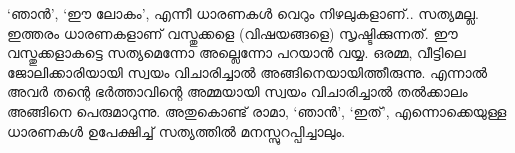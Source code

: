 ‘ഞാൻ’, ‘ഈ ലോകം’, എന്നീ ധാരണകൾ വെറും നിഴലുകളാണ്‌..  സത്യമല്ല. ഇത്തരം ധാരണകളാണ്‌ വസ്തുക്കളെ (വിഷയങ്ങളെ) സൃഷ്ടിക്കുന്നത്. ഈ വസ്തുക്കളാകട്ടെ സത്യമെന്നോ അല്ലെന്നോ പറയാൻ വയ്യ. ഒരമ്മ, വീട്ടിലെ ജോലിക്കാരിയായി സ്വയം വിചാരിച്ചാൽ അങ്ങിനെയായിത്തീരുന്നു. എന്നാൽ അവർ തന്റെ ഭർത്താവിന്റെ അമ്മയായി സ്വയം വിചാരിച്ചാൽ തല്‍ക്കാലം അങ്ങിനെ പെരുമാറുന്നു. അതുകൊണ്ട് രാമാ, ‘ഞാൻ’, ‘ഇത്’, എന്നൊക്കെയുള്ള ധാരണകൾ ഉപേക്ഷിച്ച് സത്യത്തിൽ മനസ്സുറപ്പിച്ചാലും.

